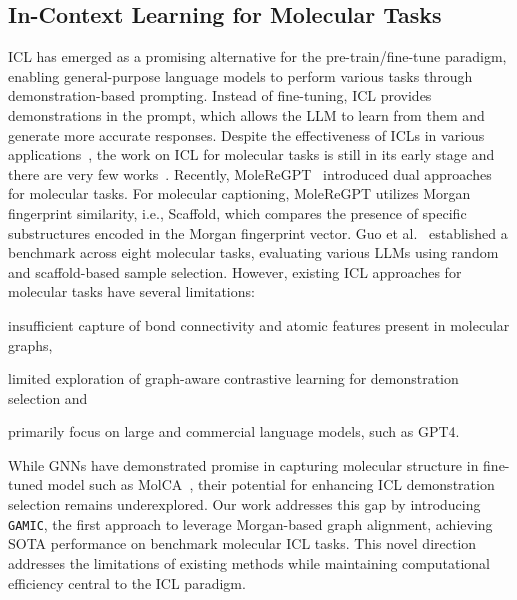 \subsection{In-Context Learning for Molecular Tasks}
ICL has emerged as a promising alternative for the pre-train/fine-tune paradigm, enabling general-purpose language models to perform various tasks through demonstration-based prompting. Instead of fine-tuning, ICL provides demonstrations in the prompt, which allows the LLM to learn from them and generate more accurate responses.   
Despite the effectiveness of ICLs in various applications~\cite{dong2022survey}, the work on ICL for molecular tasks is still in its early stage and there are very few works~\cite{li_empowering_2024,guo_what_2023}. %
Recently, MoleReGPT~\cite{li_empowering_2024} introduced dual approaches for molecular tasks. For molecular captioning, MoleReGPT utilizes Morgan fingerprint similarity, i.e., Scaffold, which compares the presence of specific substructures encoded in the Morgan fingerprint vector. %
Guo et al.~\cite{guo_what_2023} established a benchmark across eight molecular tasks, evaluating various LLMs using random and scaffold-based sample selection. However, existing ICL approaches for molecular tasks have several limitations:
\begin{inparaenum}[(a)]
    \item insufficient capture of bond connectivity and atomic features present in molecular graphs,
    \item limited exploration of graph-aware contrastive learning for demonstration selection and
    \item primarily focus on large and commercial language models, such as GPT4.
\end{inparaenum}

While GNNs have demonstrated promise in capturing molecular structure in fine-tuned model such as  MolCA~\cite{liu_molca_2023}, their potential for enhancing ICL demonstration selection remains underexplored. Our work addresses this gap by introducing \texttt{GAMIC}, the first approach to leverage Morgan-based graph alignment, achieving SOTA performance on benchmark molecular ICL tasks. This novel direction addresses the limitations of existing methods while maintaining computational efficiency central to the ICL paradigm.


